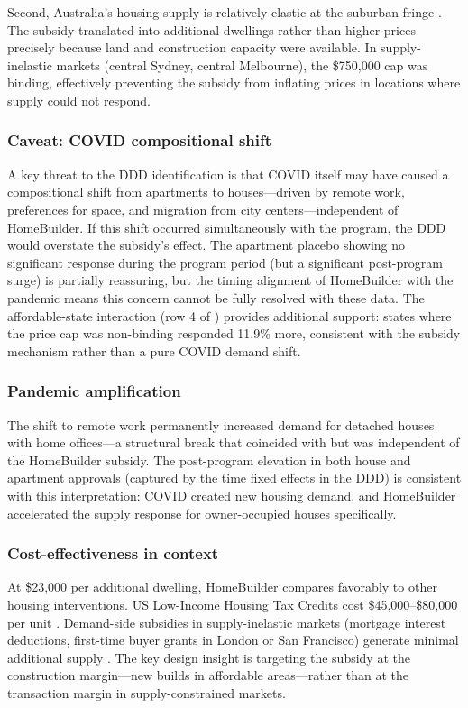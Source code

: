 \documentclass[12pt]{article}
\begin{document}
Second, Australia's housing supply is relatively elastic at the suburban fringe \citep{caldera2013}. The subsidy translated into additional dwellings rather than higher prices precisely because land and construction capacity were available. In supply-inelastic markets (central Sydney, central Melbourne), the \$750,000 cap was binding, effectively preventing the subsidy from inflating prices in locations where supply could not respond.

\subsubsection*{Caveat: COVID compositional shift} A key threat to the DDD identification is that COVID itself may have caused a compositional shift from apartments to houses---driven by remote work, preferences for space, and migration from city centers---independent of HomeBuilder. If this shift occurred simultaneously with the program, the DDD would overstate the subsidy's effect. The apartment placebo showing no significant response during the program period (but a significant post-program surge) is partially reassuring, but the timing alignment of HomeBuilder with the pandemic means this concern cannot be fully resolved with these data. The affordable-state interaction (row 4 of ) provides additional support: states where the price cap was non-binding responded 11.9\% more, consistent with the subsidy mechanism rather than a pure COVID demand shift.

\subsubsection*{Pandemic amplification} The shift to remote work permanently increased demand for detached houses with home offices---a structural break that coincided with but was independent of the HomeBuilder subsidy. The post-program elevation in both house and apartment approvals (captured by the time fixed effects in the DDD) is consistent with this interpretation: COVID created new housing demand, and HomeBuilder accelerated the supply response for owner-occupied houses specifically.

\subsubsection*{Cost-effectiveness in context} At \$23,000 per additional dwelling, HomeBuilder compares favorably to other housing interventions. US Low-Income Housing Tax Credits cost \$45,000--\$80,000 per unit \citep{suarez2020}. Demand-side subsidies in supply-inelastic markets (mortgage interest deductions, first-time buyer grants in London or San Francisco) generate minimal additional supply \citep{glaeser2008}. The key design insight is targeting the subsidy at the construction margin---new builds in affordable areas---rather than at the transaction margin in supply-constrained markets.
\end{document}
